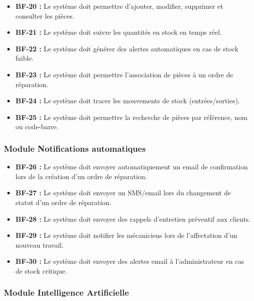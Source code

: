 \begin{itemize}
    \item \textbf{BF-20 :} Le système doit permettre d'ajouter, modifier, supprimer et consulter les pièces.
    
    \item \textbf{BF-21 :} Le système doit suivre les quantités en stock en temps réel.
    
    \item \textbf{BF-22 :} Le système doit générer des alertes automatiques en cas de stock faible.
    
    \item \textbf{BF-23 :} Le système doit permettre l'association de pièces à un ordre de réparation.
    
    \item \textbf{BF-24 :} Le système doit tracer les mouvements de stock (entrées/sorties).
    
    \item \textbf{BF-25 :} Le système doit permettre la recherche de pièces par référence, nom ou code-barre.
\end{itemize}

\subsubsection{Module Notifications automatiques}

\begin{itemize}
    \item \textbf{BF-26 :} Le système doit envoyer automatiquement un email de confirmation lors de la création d'un ordre de réparation.
    
    \item \textbf{BF-27 :} Le système doit envoyer un SMS/email lors du changement de statut d'un ordre de réparation.
    
    \item \textbf{BF-28 :} Le système doit envoyer des rappels d'entretien préventif aux clients.
    
    \item \textbf{BF-29 :} Le système doit notifier les mécaniciens lors de l'affectation d'un nouveau travail.
    
    \item \textbf{BF-30 :} Le système doit envoyer des alertes email à l'administrateur en cas de stock critique.
\end{itemize}

\subsubsection{Module Intelligence Artificielle}

